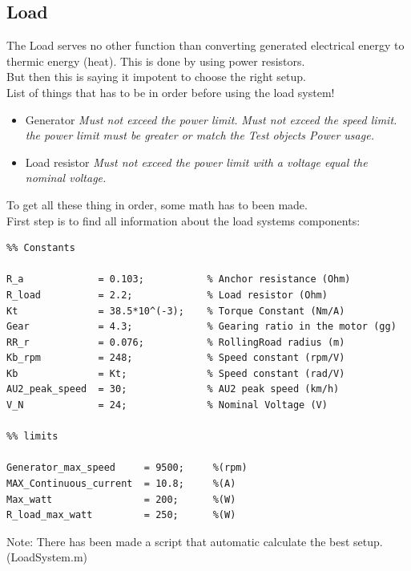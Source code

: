 \subsection{Load}
The Load serves no other function than converting generated electrical energy to thermic energy (heat). This is done by using power resistors.\\
But then this is saying it impotent to choose the right setup.\\

\large List of things that has to be in order before using the load system!
\begin{itemize}
	\item {Generator}
	\subitem \textit{Must not exceed the power limit.}
	\subitem \textit{Must not exceed the speed limit.}
	\subitem \textit{the power limit must be greater or match the Test objects Power usage.}
	\item {Load resistor}
	\subitem \textit{Must not exceed the power limit with a voltage equal the nominal voltage.}
\end{itemize}

To get all these thing in order, some math has to been made. \\
First step is to find all information about the load systems components: 

\lstset{language=MATLAB}
\begin{lstlisting}
%% Constants

R_a             = 0.103;           % Anchor resistance (Ohm)
R_load          = 2.2;             % Load resistor (Ohm)
Kt              = 38.5*10^(-3);    % Torque Constant (Nm/A)
Gear            = 4.3;             % Gearing ratio in the motor (gg)
RR_r            = 0.076;           % RollingRoad radius (m)
Kb_rpm          = 248;             % Speed constant (rpm/V)
Kb              = Kt;              % Speed constant (rad/V)
AU2_peak_speed  = 30;              % AU2 peak speed (km/h)
V_N             = 24;              % Nominal Voltage (V)

%% limits

Generator_max_speed     = 9500;     %(rpm)
MAX_Continuous_current  = 10.8;     %(A)
Max_watt                = 200;      %(W)
R_load_max_watt         = 250;      %(W)
\end{lstlisting}

Note: There has been made a script that automatic calculate the best setup. (LoadSystem.m)\\
\\

